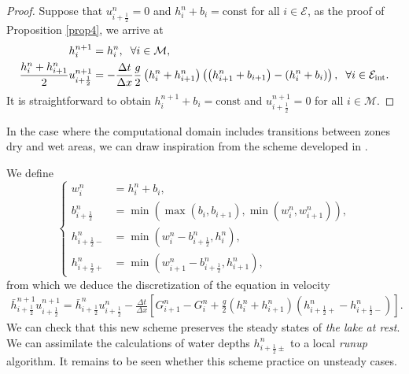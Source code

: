 \documentclass[11pt,a4paper,center,notitlepage]{article}
\numberwithin{equation}{section}
\begin{document}
\begin{proof}
Suppose that $u_{i+\frac{1}{2}}^n = 0$ and $h_i^n + b_i = \mbox{const}$ for all $i \in \mathcal{E}$, as the proof of Proposition \ref{prop4}, we arrive at 
\begin{align*}
h_i^{n + 1} &= h_i^n, \hspace{2mm} \forall i \in \mathcal{M},\\
\frac{{h_i^n + h_{i + 1}^n}}{2}u_{i + \frac{1}{2}}^{n + 1} &=  - \frac{{\Delta t}}{{\Delta x}}\frac{g}{2}\left( {h_i^n + h_{i + 1}^n} \right)\left( {\left( {h_{i + 1}^n + {b_{i + 1}}} \right) - \left( {h_i^n + {b_i}} \right)} \right), \hspace{2mm} \forall i \in {\mathcal{E}_{\rm int }}.
\end{align*}
It is straightforward to obtain $h_i^{n+1} + b_i =\mbox{const}$ and $u_{i+\frac{1}{2}}^{n+1} =0 $ for all $i \in \mathcal{M}$. 
\end{proof}
In the case where the computational domain includes transitions between zones dry and wet areas, we can draw inspiration from the scheme developed in \cite{Chen2017}.

We define
\begin{equation}
\left\{ \begin{split}
w_i^n &= h_i^n + {b_i},\\
b_{i + \frac{1}{2}}^n &= \min \left( {\max \left( {{b_i},{b_{i + 1}}} \right),\min \left( {w_i^n,w_{i + 1}^n} \right)} \right),\\
h_{i + \frac{1}{2} - }^n &= \min \left( {w_i^n - b_{i + \frac{1}{2}}^n,h_i^n} \right),\\
h_{i + \frac{1}{2} + }^n &= \min \left( {w_{i + 1}^n - b_{i + \frac{1}{2}}^n,h_{i + 1}^n} \right),
\end{split} \right.
\end{equation}
from which we deduce the discretization of the equation in velocity
\begin{align}
\bar h_{i + \frac{1}{2}}^{n + 1}u_{i + \frac{1}{2}}^{n + 1} = \bar h_{i + \frac{1}{2}}^nu_{i + \frac{1}{2}}^n - \frac{{\Delta t}}{{\Delta x}}\left[ {G_{i + 1}^n - G_i^n + \frac{g}{2}\left( {h_i^n + h_{i + 1}^n} \right)\left( {h_{i + \frac{1}{2} + }^n - h_{i + \frac{1}{2} - }^n} \right)} \right].
\end{align}
We can check that this new scheme preserves the steady states of \textit{the lake at rest}. We can assimilate the calculations of water depths $h_{i+\frac{1}{2}\pm}^n$ to a local \textit{runup} algorithm. It remains to be seen whether this scheme practice on unsteady cases.

\printbibliography
%
%
\end{document}
